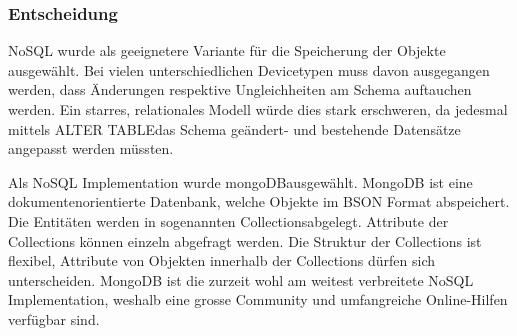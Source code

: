\subsubsection{Entscheidung}
NoSQL wurde als geeignetere Variante für die Speicherung der Objekte ausgewählt. Bei vielen unterschiedlichen Devicetypen muss davon ausgegangen werden, dass Änderungen respektive Ungleichheiten am Schema auftauchen werden. Ein starres, relationales Modell würde dies stark erschweren, da jedesmal mittels \glqq ALTER TABLE\grqq  das Schema geändert- und bestehende Datensätze angepasst werden müssten.

Als NoSQL Implementation wurde \glqq mongoDB\grqq ausgewählt. MongoDB ist eine dokumentenorientierte Datenbank, welche Objekte im BSON Format abspeichert. Die Entitäten werden in sogenannten \glqq Collections\grqq  abgelegt. Attribute der Collections können einzeln abgefragt werden. Die Struktur der Collections ist flexibel, Attribute von Objekten innerhalb der Collections dürfen sich unterscheiden. MongoDB ist die zurzeit wohl am weitest verbreitete NoSQL Implementation, weshalb eine grosse Community und umfangreiche Online-Hilfen verfügbar sind.
 




